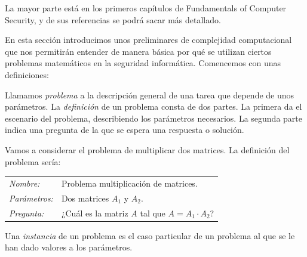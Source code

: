 La mayor parte está en los primeros capítulos de Fundamentals of Computer Security, y de sus referencias se podrá sacar más detallado.








En esta sección introducimos unos preliminares de complejidad computacional que nos permitirán entender de manera básica por qué se utilizan ciertos problemas matemáticos en la seguridad informática. Comencemos con unas definiciones:

\begin{definition}
	Llamamos \textit{problema} a la descripción general de una tarea que depende de unos parámetros. La \textit{definición} de un problema consta de dos partes. La primera da el escenario del problema, describiendo los parámetros necesarios. La segunda parte indica una pregunta de la que se espera una respuesta o solución.
\end{definition}

\begin{example}
	Vamos a considerar el problema de multiplicar dos matrices. La definición del problema sería:
	
	\begin{tabular}{|ll}
		\textit{Nombre:} & Problema multiplicación de matrices. \\
		\textit{Parámetros:} & Dos matrices $A_1$ y $A_2$. \\
		\textit{Pregunta:} & ¿Cuál es la matriz $A$ tal que $A=A_1 \cdot A_2$? \\
	\end{tabular}
\end{example}

\begin{definition}
   Una \textit{instancia} de un problema es el caso particular de un problema al que se le han dado valores a los parámetros.
\end{definition}


